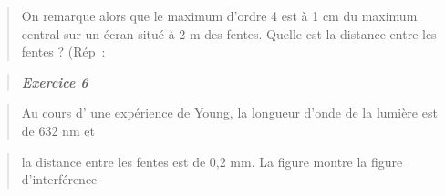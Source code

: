 \begin{quote}
On remarque alors que le maximum d'ordre 4 est à 1 cm du maximum central
sur un écran situé à 2 m des fentes. Quelle est la distance entre les
fentes\textbf{ }? (Rép~:
\end{quote}

\begin{quote}
\end{quote}

\begin{quote}
\end{quote}

\begin{quote}
\end{quote}

\begin{quote}
\end{quote}

\begin{quote}
\end{quote}

\begin{quote}
\end{quote}

\begin{quote}
\end{quote}

\begin{quote}
\end{quote}

\begin{quote}
\end{quote}

\begin{quote}
\end{quote}

\begin{quote}
\end{quote}

\begin{quote}
\end{quote}

\begin{quote}
\emph{\textbf{Exercice 6}}
\end{quote}

\begin{quote}
Au cours d' une expérience de Young, la longueur d'onde de la lumière
est de 632 nm et
\end{quote}

\begin{quote}
la distance entre les fentes est de 0,2 mm. La figure montre la figure
d'interférence
\end{quote}

